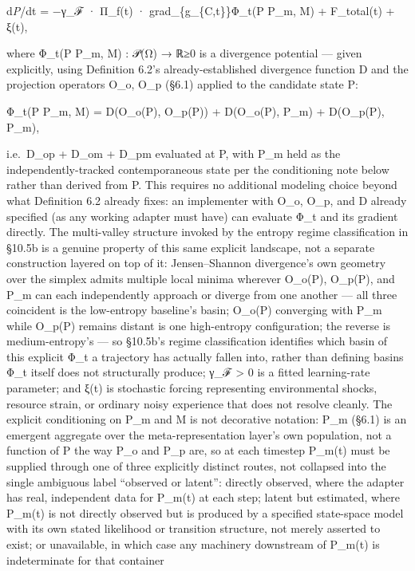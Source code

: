 \documentclass[
]{article}
\begin{document}
d\emph{P}/dt = −γ\_ℱ · Π\_f(t) · grad\_\{g\_\{C,t\}\}Φ\_t(P \textbar{}
P\_m, M) + F\_total(t) + ξ(t),

where Φ\_t(P \textbar{} P\_m, M) : 𝒫(Ω) → ℝ≥0 is a divergence potential
--- given explicitly, using Definition 6.2's already-established
divergence function D and the projection operators O\_o, O\_p (§6.1)
applied to the candidate state P:

Φ\_t(P \textbar{} P\_m, M) = D(O\_o(P), O\_p(P)) + D(O\_o(P), P\_m) +
D(O\_p(P), P\_m),

i.e.~D\_op + D\_om + D\_pm evaluated at P, with P\_m held as the
independently-tracked contemporaneous state per the conditioning note
below rather than derived from P. This requires no additional modeling
choice beyond what Definition 6.2 already fixes: an implementer with
O\_o, O\_p, and D already specified (as any working adapter must have)
can evaluate Φ\_t and its gradient directly. The multi-valley structure
invoked by the entropy regime classification in §10.5b is a genuine
property of this same explicit landscape, not a separate construction
layered on top of it: Jensen--Shannon divergence's own geometry over the
simplex admits multiple local minima wherever O\_o(P), O\_p(P), and P\_m
can each independently approach or diverge from one another --- all
three coincident is the low-entropy baseline's basin; O\_o(P) converging
with P\_m while O\_p(P) remains distant is one high-entropy
configuration; the reverse is medium-entropy's --- so §10.5b's regime
classification identifies which basin of this explicit Φ\_t a trajectory
has actually fallen into, rather than defining basins Φ\_t itself does
not structurally produce; γ\_ℱ \textgreater{} 0 is a fitted
learning-rate parameter; and ξ(t) is stochastic forcing representing
environmental shocks, resource strain, or ordinary noisy experience that
does not resolve cleanly. The explicit conditioning on P\_m and M is not
decorative notation: P\_m (§6.1) is an emergent aggregate over the
meta-representation layer's own population, not a function of P the way
P\_o and P\_p are, so at each timestep P\_m(t) must be supplied through
one of three explicitly distinct routes, not collapsed into the single
ambiguous label ``observed or latent'': directly observed, where the
adapter has real, independent data for P\_m(t) at each step; latent but
estimated, where P\_m(t) is not directly observed but is produced by a
specified state-space model with its own stated likelihood or transition
structure, not merely asserted to exist; or unavailable, in which case
any machinery downstream of P\_m(t) is indeterminate for that container
\end{document}
